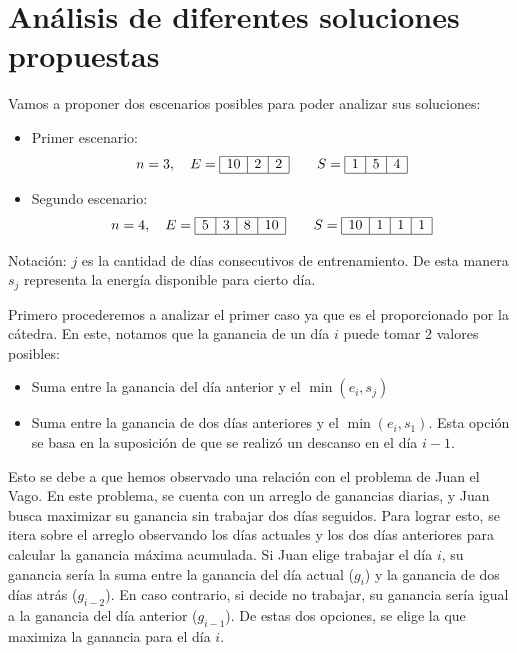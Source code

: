 \section{Análisis de diferentes soluciones propuestas}

Vamos a proponer dos escenarios posibles para poder analizar sus soluciones:

\begin{itemize}
    \item Primer escenario:
    $$
    n = 3,\quad
    E=
    \begin{array}{|c|c|c|}
        \hline 
        10 & 2 & 2\\
        \hline 
    \end{array}
    \qquad
    S=
    \begin{array}{|c|c|c|}
        \hline 
        1 & 5 & 4\\
        \hline 
    \end{array}
    $$

    \item Segundo escenario:
    $$
    n = 4,\quad
    E=
    \begin{array}{|c|c|c|c|}
        \hline 
        5 & 3 & 8 & 10\\
        \hline 
    \end{array}
    \qquad
    S=
    \begin{array}{|c|c|c|c|}
        \hline 
        10 & 1 & 1 & 1\\
        \hline 
    \end{array}
    $$
\end{itemize}

Notación: $j$ es la cantidad de días consecutivos de entrenamiento.
De esta manera $s_j$ representa la energía disponible para cierto día.

Primero procederemos a analizar el primer caso ya que es el proporcionado por la cátedra. En este,
notamos que la ganancia de un día $i$ puede tomar 2 valores posibles:

\begin{itemize}
    \item Suma entre la ganancia del día anterior y el $\min{(e_i, s_j)}$
    \item Suma entre la ganancia de dos días anteriores y el $\min{(e_i, s_1)}$. Esta opción se basa 
    en la suposición de que se realizó un descanso en el día $i-1$.
\end{itemize}

Esto se debe a que hemos observado una relación con el problema de Juan el Vago. En este problema, se cuenta
con un arreglo de ganancias diarias, y Juan busca maximizar su ganancia sin trabajar dos días seguidos. Para
lograr esto, se itera sobre el arreglo observando los días actuales y los dos días anteriores para calcular
la ganancia máxima acumulada.
Si Juan elige trabajar el día $i$, su ganancia sería la suma entre la ganancia del día actual ($g_i$) y
la ganancia de dos días atrás ($g_{i-2}$). En caso contrario, si decide no trabajar, su ganancia sería igual
a la ganancia del día anterior ($g_{i-1}$). De estas dos opciones, se elige la que maximiza la ganancia para
el día $i$.

